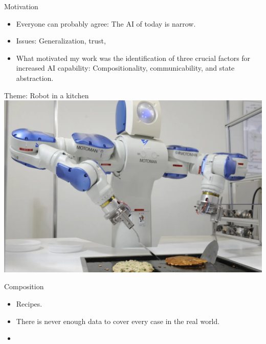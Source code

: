 \begin{frame}{Motivation}
\begin{itemize}
    \item Everyone can probably agree: The AI of today is narrow.
    \item Issues: Generalization, trust, 
    
    \item What motivated my work was the identification of three crucial factors for increased AI capability: Compositionality, communicability, and state abstraction.
\end{itemize}
\end{frame}


\begin{frame}{Theme: Robot in a kitchen}
    \includegraphics[width=.7\textwidth]{images/robot-cooking.png}
\end{frame}


\begin{frame}{Composition}
\begin{itemize}
    \item Recipes.
    \item There is never enough data to cover every case in the real world.
    \item 
\end{itemize}
\end{frame}

